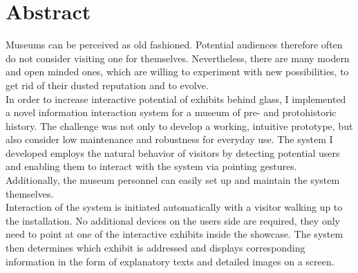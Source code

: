 \chapter*{Abstract}
\label{abstract}

Museums can be perceived as old fashioned. Potential audiences therefore often do not consider visiting one for themselves. Nevertheless, there are many modern and open minded ones, which are willing to experiment with new possibilities, to get rid of their dusted reputation and to evolve.
\\
In order to increase interactive potential of exhibits behind glass, I implemented a novel information interaction system for a museum of pre- and protohistoric history. The challenge was not only to develop a working, intuitive prototype, but also consider low maintenance and robustness for everyday use. The system I developed employs the natural behavior of visitors by detecting potential users and enabling them to interact with the system via pointing gestures. Additionally, the museum personnel can easily set up and maintain the
system themselves.
\\
Interaction of the system is initiated automatically with a visitor walking up to the installation. No additional devices on the users
side are required, they only need to point at one of the interactive exhibits inside the showcase. The system then determines which exhibit is addressed and displays corresponding information in the form of explanatory texts and detailed images on a screen.


